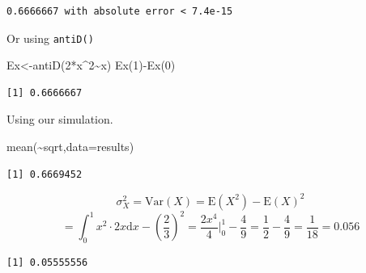 \documentclass[
  letterpaper,
  DIV=11,
  numbers=noendperiod]{scrreprt}
\newenvironment{Shaded}{\begin{snugshade}}{\end{snugshade}}
\newcommand{\AttributeTok}[1]{\textcolor[rgb]{0.40,0.45,0.13}{#1}}
\newcommand{\ControlFlowTok}[1]{\textcolor[rgb]{0.00,0.23,0.31}{#1}}
\newcommand{\DecValTok}[1]{\textcolor[rgb]{0.68,0.00,0.00}{#1}}
\newcommand{\FunctionTok}[1]{\textcolor[rgb]{0.28,0.35,0.67}{#1}}
\newcommand{\NormalTok}[1]{\textcolor[rgb]{0.00,0.23,0.31}{#1}}
\newcommand{\OtherTok}[1]{\textcolor[rgb]{0.00,0.23,0.31}{#1}}
\newcommand{\SpecialCharTok}[1]{\textcolor[rgb]{0.37,0.37,0.37}{#1}}
\begin{document}
\begin{verbatim}
0.6666667 with absolute error < 7.4e-15
\end{verbatim}

Or using \texttt{antiD()}

\begin{Shaded}
\begin{Highlighting}[]
\NormalTok{Ex}\OtherTok{\textless{}{-}}\FunctionTok{antiD}\NormalTok{(}\DecValTok{2}\SpecialCharTok{*}\NormalTok{x}\SpecialCharTok{\^{}}\DecValTok{2}\SpecialCharTok{\textasciitilde{}}\NormalTok{x)}
\FunctionTok{Ex}\NormalTok{(}\DecValTok{1}\NormalTok{)}\SpecialCharTok{{-}}\FunctionTok{Ex}\NormalTok{(}\DecValTok{0}\NormalTok{)}
\end{Highlighting}
\end{Shaded}

\begin{verbatim}
[1] 0.6666667
\end{verbatim}

Using our simulation.

\begin{Shaded}
\begin{Highlighting}[]
\FunctionTok{mean}\NormalTok{(}\SpecialCharTok{\textasciitilde{}}\NormalTok{sqrt,}\AttributeTok{data=}\NormalTok{results)}
\end{Highlighting}
\end{Shaded}

\begin{verbatim}
[1] 0.6669452
\end{verbatim}

\[
\sigma^2_X = \mbox{Var}(X)= \mbox{E}(X^2)-\mbox{E}(X)^2
\]
\[= \int_0^1 x^2\cdot 2x\mbox{d}x - \left(\frac{2}{3}\right)^2 = \frac{2x^4}{4}\bigg|_0^1-\frac{4}{9}=\frac{1}{2}-\frac{4}{9}=\frac{1}{18}=0.056
\]

\begin{Shaded}
\end{Shaded}

\begin{verbatim}
[1] 0.05555556
\end{verbatim}
\end{document}

